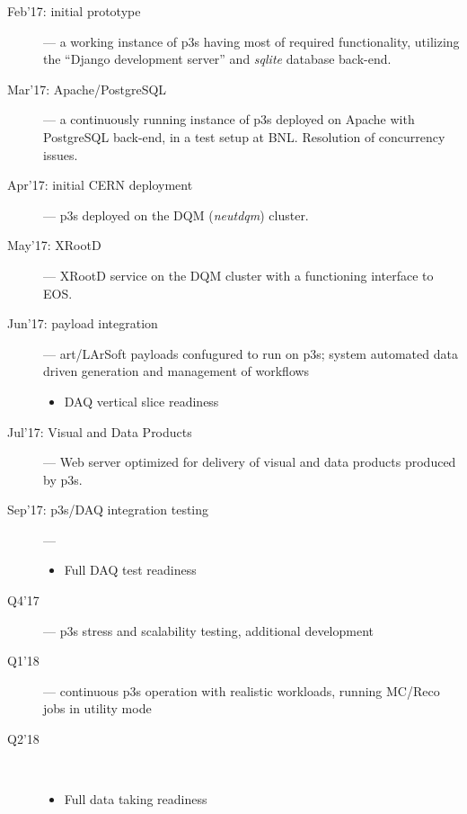 \documentclass[pdftex,12pt,letter]{article}
\begin{document}
\begin{description}

\item[Feb'17: initial prototype] --- a working instance of p3s having most of
required functionality, utilizing the ``Django development server'' and \textit{sqlite}
database back-end.

\item[Mar'17: Apache/PostgreSQL] --- a continuously running instance of
p3s deployed on Apache with PostgreSQL back-end, in a test setup at BNL.
Resolution of concurrency issues.

\item[Apr'17: initial CERN deployment] --- p3s deployed on the DQM (\textit{neutdqm}) cluster.

\item[May'17: XRootD] --- XRootD service on the DQM cluster with
a functioning interface to EOS.

\item[Jun'17: payload integration] --- art/LArSoft payloads confugured to run on p3s; system
 automated data driven generation and management of workflows
\begin{itemize}
\item DAQ vertical slice readiness
\end{itemize}

\item[Jul'17: Visual and Data Products] --- Web server optimized
for delivery of visual and data products produced by p3s.


\item[Sep'17: p3s/DAQ integration testing] --- 
\begin{itemize}
\item Full DAQ test readiness
\end{itemize}

\item[Q4'17] --- p3s stress and scalability testing, additional development

\item[Q1'18] --- continuous p3s operation with realistic workloads, running
MC/Reco jobs in utility mode

\item[Q2'18]\ 
\begin{itemize}
\item Full data taking readiness
\end{itemize}

\end{description}
\end{document}

